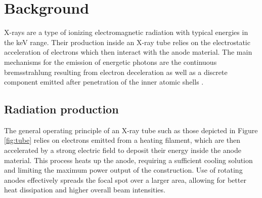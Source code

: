 \section{Background}

X-rays are a type of ionizing electromagnetic radiation with typical energies in the \unit{\kilo\electronvolt} range. Their
production inside an X-ray tube relies on the electrostatic acceleration of electrons which then interact with the anode material. The main
mechanisms for the emission of energetic photons are the continuous bremsstrahlung resulting from electron deceleration as well as a
discrete component emitted after penetration of the inner atomic shells \cite{McMorrow_2011_1, McMorrow_2011_2}.



\subsection{Radiation production}

The general operating principle of an X-ray tube such as those depicted in Figure \ref{fig:tube} relies on electrons emitted from a heating
filament, which are then accelerated by a strong electric field to deposit their energy inside the anode material. This process heats up the
anode, requiring a sufficient cooling solution and limiting the maximum power output of the construction. Use of rotating anodes effectively
spreads the focal spot over a larger area, allowing for better heat dissipation and higher overall beam intensities. 

